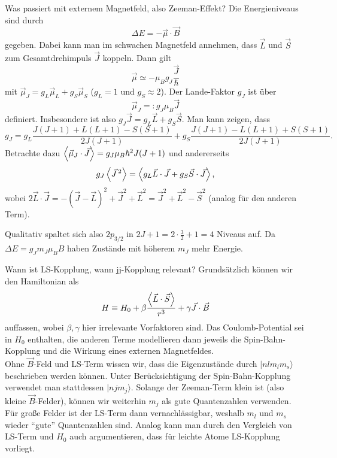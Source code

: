 \begin{fquestion}{Was passiert mit externem Magnetfeld, also Zeeman-Effekt?}
    Die Energieniveaus sind durch 
    $$\Delta E = -\Vec{\mu}\cdot\Vec{B}$$
    gegeben.
    Dabei kann man im schwachen Magnetfeld annehmen, dass $\Vec{L}$ und $\Vec{S}$ zum Gesamtdrehimpuls $\Vec{J}$ koppeln.
    Dann gilt
    $$\Vec{\mu} \simeq -\mu_Bg_J\frac{\Vec{J}}{\hbar}$$
    mit $\Vec{\mu}_J = g_L\Vec{\mu}_L + g_S\Vec{\mu}_S$ ($g_L = 1$ und $g_S \approx 2$).
    Der Lande-Faktor $g_J$ ist über
    $$\Vec{\mu}_J =: g_J\mu_B\Vec{J}$$
    definiert.
    Insbesondere ist also $g_J\Vec{J} = g_L\Vec{L} + g_S\Vec{S}$.
    Man kann zeigen, dass
    $$g_J = g_L \frac{J(J+1) + L(L+1) - S(S+1)}{2J(J+1)} + g_S \frac{J(J+1) - L(L+1) + S(S+1)}{2J(J+1)}.$$
    Betrachte dazu $\expval{\Vec{\mu}_J\cdot\Vec{J}} = g_J\mu_B\hbar^2 J(J+1)$ und andererseits
    $$g_J\expval{\Vec{J}\,^2} = \expval{g_L\Vec{L}\cdot\Vec{J} + g_S\Vec{S}\cdot\Vec{J}}, $$
    wobei $2\Vec{L}\cdot\Vec{J} = -(\Vec{J}-\Vec{L})^2 + \Vec{J}^2 + \Vec{L}^2 = \Vec{J}^2+\Vec{L}^2 - \Vec{S}^2$ (analog für den anderen Term).
    
    Qualitativ spaltet sich also $2p_{3/2}$ in $2J + 1 = 2\cdot \frac{3}{2} + 1 = 4$ Niveaus auf.
    Da $\Delta E = g_Jm_J\mu_B B$ haben Zustände mit höherem $m_J$ mehr Energie.
\end{fquestion}

\begin{fquestion}{Wann ist LS-Kopplung, wann jj-Kopplung relevant?}
    Grundsätzlich können wir den Hamiltonian als 
    $$H \equiv H_0 + \beta\frac{\expval{\Vec{L}\cdot\Vec{S} }}{r^3} + \gamma \Vec{J}\cdot\Vec{B}$$
    auffassen, wobei $\beta,\gamma$ hier irrelevante Vorfaktoren sind.
    Das Coulomb-Potential sei in $H_0$ enthalten, die anderen Terme modellieren dann jeweils die Spin-Bahn-Kopplung und die Wirkung eines externen Magnetfeldes.
    \\
    Ohne $\Vec{B}$-Feld und LS-Term wissen wir, dass die Eigenzustände durch $|nlm_lm_s\rangle$ beschrieben werden können.
    Unter Berücksichtigung der Spin-Bahn-Kopplung verwendet man stattdessen $|njm_j\rangle$.
    Solange der Zeeman-Term klein ist (also kleine $\Vec{B}$-Felder), können wir weiterhin $m_j$ als gute Quantenzahlen verwenden.
    Für große Felder ist der LS-Term dann vernachlässigbar, weshalb $m_l$ und $m_s$ wieder ``gute'' Quantenzahlen sind.
    Analog kann man durch den Vergleich von LS-Term und $H_0$ auch argumentieren, dass für leichte Atome LS-Kopplung vorliegt.
\end{fquestion}

